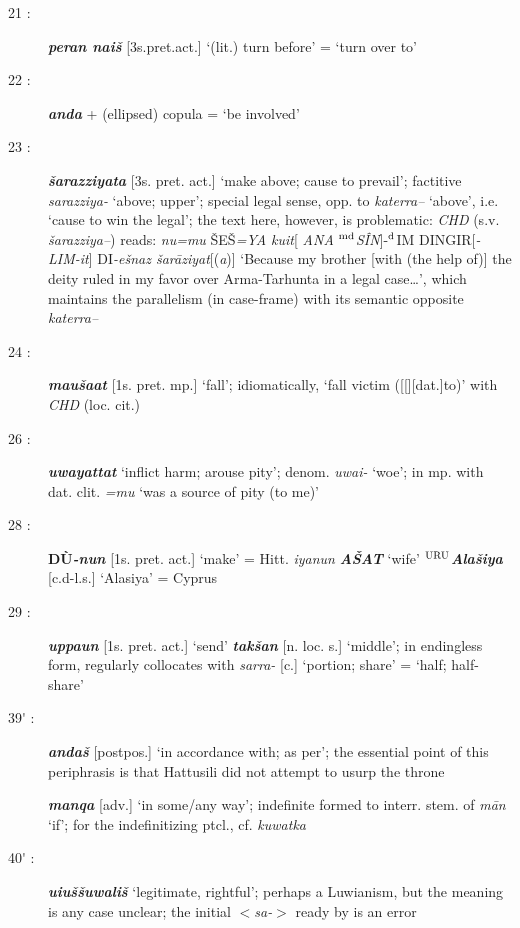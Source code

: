 \documentclass[10pt]{article}
\newcommand{\supersc}[1]{$^{\textrm{\scriptsize{#1}}}$}  	%
\newcommand{\bit}[1]{\textbf{\textit{#1}}}				%
\newcommand{\p}[1]{{\tiny[{#1}]}}					%
\newcommand{\pr}{\'{ }}									%
\newcommand{\hith}{\textsubwedge{h}}
\newcommand{\city}{\supersc{URU}}
\renewcommand{\.}[1]{\textsubdot{#1}}
\begin{document}
\begin{description}
\item[21 :] \bit{peran nai\v{s}} \p{3s.pret.act.} `(lit.) turn before' = `turn over to'

\item[22 :] \bit{anda} + (ellipsed) copula = `be involved'

\item[23 :] \bit{\v{s}arazziya{\hith}ta} \p{3s. pret. act.} `make above; cause to prevail'; factitive \textit{sarazziya-} `above; upper'; special legal sense, opp. to \textit{katerra{\hith}{\hith}--} `above', i.e. `cause to win the legal'; the text here, however, is problematic: \textit{CHD} (s.v. \textit{\v{s}arazziya{\hith}{\hith}--}) reads: \textit{nu=mu} \v{S}E\v{S}\textit{=YA kuit}[ \textit{ANA} \supersc{md}\textit{S\^IN}]-\supersc{d}IM DINGIR[\textit{-LIM-it}] DI\textit{-e\v{s}naz \v{s}ar\=aziya{\hith}t}[(\textit{a})] `Because my brother [with (the help of)] the deity ruled in my favor over Arma-Tarhunta in a legal case{\ldots}', which maintains the parallelism (in case-frame) with its semantic opposite \textit{katerra{\hith}{\hith}--}

\item[24 :] \bit{mau\v{s}{\hith}a{\hith}at} \p{1s. pret. mp.} `fall'; idiomatically, `fall victim (\p[{[dat.]}to)' with \textit{CHD} (loc. cit.)

\item[26 :] \bit{uwayattat} `inflict harm; arouse pity'; denom. \textit{uwai-} `woe'; in mp. with dat. clit. \textit{=mu} `was a source of pity (to me)'

\item[28 :] \textbf{D\`U}\bit{-nun} \p{1s. pret. act.} `make' = Hitt. \textit{iyanun} \bit{A\v{S}AT} `wife' \textbf{\city}\bit{Ala\v{s}iya} \p{c.d-l.s.} `Alasiya' = Cyprus

\item[29 :] \bit{uppa{\hith\hith}un} \p{1s. pret. act.} `send' \bit{tak\v{s}an} \p{n. loc. s.} `middle'; in endingless form, regularly collocates with \textit{sarra-} \p{c.} `portion; share' = `half; half-share' 

\item[39{\pr} :] \bit{{\hith}anda\v{s}} \p{postpos.} `in accordance with; as per'; the essential point of this periphrasis is that Hattusili did not attempt to usurp the throne

\bit{manqa} \p{adv.} `in some/any way'; indefinite formed to interr. stem. of \textit{m\=an} `if'; for the indefinitizing ptcl., cf. \textit{kuwatka}

\item[40{\pr} :] \bit{{\hith}ui{\hith}u\v{s}\v{s}uwali\v{s}} `legitimate, rightful'; perhaps a Luwianism, but the meaning is any case unclear; the initial $<$\textit{sa-}$>$ ready by \citet[20]{otten1981hattusili} is an error


\end{description}
\end{document}
